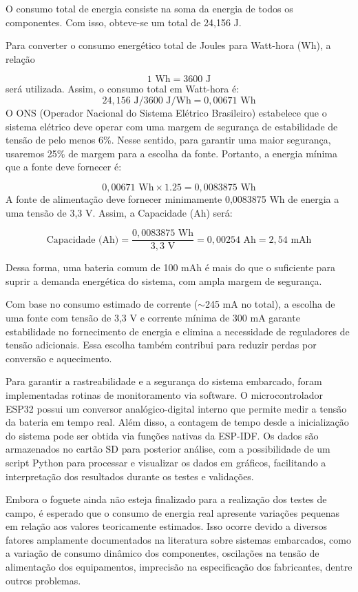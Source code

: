 O consumo total de energia consiste na soma da energia de todos os componentes. Com isso, obteve-se um total de 24,156 J.

Para converter o consumo energético total de Joules para Watt-hora (Wh), a relação

\begin{equation}
1 \text{ Wh} = 3600 \text{ J}
\end{equation}
será utilizada. Assim, o consumo total em Watt-hora é:
\begin{equation}
24,156 \text{ J} / 3600 \text{ J/Wh} = 0,00671 \text{ Wh}
\end{equation}
O ONS (Operador Nacional do Sistema Elétrico Brasileiro) estabelece que o sistema elétrico deve operar com uma margem de segurança de estabilidade de tensão de pelo menos 6\%. Nesse sentido, para garantir uma maior segurança, usaremos 25\% de margem para a escolha da fonte. Portanto, a energia mínima que a fonte deve fornecer é:

\begin{equation}
0,00671 \text{ Wh} \times 1.25 = 0,0083875 \text{ Wh}
\end{equation}
A fonte de alimentação deve fornecer minimamente 0,0083875 Wh de energia a uma tensão de 3,3 V. Assim, a Capacidade (Ah) será:


\begin{equation}
\text{Capacidade (Ah)} = \frac{0,0083875 \text{ Wh}}{3,3 \text{ V}} = 0,00254 \text{ Ah} = 2,54 \text{ mAh}
\end{equation}

Dessa forma, uma bateria comum de 100 mAh é mais do que o suficiente para suprir a demanda energética do sistema, com ampla margem de segurança.

Com base no consumo estimado de corrente ($\sim$245 mA no total), a escolha de uma fonte com tensão de 3,3 V e corrente mínima de 300 mA garante estabilidade no fornecimento de energia e elimina a necessidade de reguladores de tensão adicionais. Essa escolha também contribui para reduzir perdas por conversão e aquecimento.

Para garantir a rastreabilidade e a segurança do sistema embarcado, foram implementadas rotinas de monitoramento via software. O microcontrolador ESP32 possui um conversor analógico-digital interno que permite medir a tensão da bateria em tempo real. Além disso, a contagem de tempo desde a inicialização do sistema pode ser obtida via funções nativas da ESP-IDF. Os dados são armazenados no cartão SD para posterior análise, com a possibilidade de um script Python para processar e visualizar os dados em gráficos, facilitando a interpretação dos resultados durante os testes e validações.

Embora o foguete ainda não esteja finalizado para a realização dos testes de campo, é esperado que o consumo de energia real apresente variações pequenas em relação aos valores teoricamente estimados. Isso ocorre devido a diversos fatores amplamente documentados na literatura sobre sistemas embarcados, como a variação de consumo dinâmico dos componentes, oscilações na tensão de alimentação dos equipamentos, imprecisão na especificação dos fabricantes, dentre outros problemas.